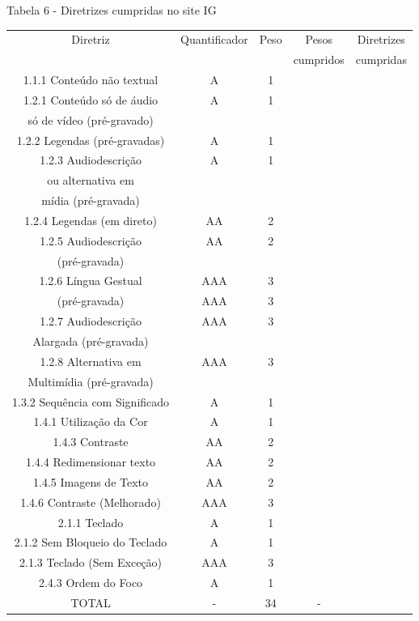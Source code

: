 \documentclass[a4paper]{article}
\begin{document}
\begin{titlepage}
Tabela 6 - Diretrizes cumpridas no site IG\\[-1cm]
\begin{center}
	\fontsize{8pt}{8pt}\selectfont	
	\begin{longtable}{|c|c|c|c|c|}
		\hline
		Diretriz & Quantificador & Peso & Pesos & Diretrizes\\
		& & & cumpridos & cumpridas\\
		\hline
		1.1.1 Conteúdo não textual & A & 1 & & \\
		\hline
		1.2.1 Conteúdo só de áudio & A & 1 & & \\
		só de vídeo (pré-gravado) & & & & \\
		\hline
		1.2.2 Legendas (pré-gravadas) & A & 1 & & \\
		\hline
		1.2.3 Audiodescrição & A & 1 & & \\
		ou alternativa em & & & & \\
		mídia (pré-gravada) & & & & \\
		\hline
		1.2.4 Legendas (em direto) & AA & 2 & & \\
		\hline
		1.2.5 Audiodescrição & AA & 2 & & \\
		(pré-gravada) & & & & \\
		\hline
		1.2.6 Língua Gestual & AAA & 3 & & \\
		(pré-gravada) & AAA & 3 & & \\
		\hline
		1.2.7 Audiodescrição & AAA & 3 & & \\
		Alargada (pré-gravada) & & & & \\
		\hline
		1.2.8 Alternativa em & AAA & 3 & & \\
		Multimídia (pré-gravada) & & & & \\
		\hline
		1.3.2 Sequência com Significado & A & 1 & & \\
		\hline
		1.4.1 Utilização da Cor & A & 1 & & \\
		\hline
		1.4.3 Contraste & AA & 2 & & \\
		\hline
		1.4.4 Redimensionar texto & AA & 2 & & \\
		\hline
		1.4.5 Imagens de Texto & AA & 2 & & \\
		\hline
		1.4.6 Contraste (Melhorado) & AAA & 3 & & \\
		\hline
		2.1.1 Teclado & A & 1 & & \\
		\hline
		2.1.2 Sem Bloqueio do Teclado & A & 1 & & \\
		\hline
		2.1.3 Teclado (Sem Exceção) & AAA & 3 & & \\
		\hline
		2.4.3 Ordem do Foco & A & 1 & & \\
		\hline
		TOTAL & - & 34 & - & \\
		\hline
	\end{longtable}
\end{center}


\end{titlepage}
\end{document}
